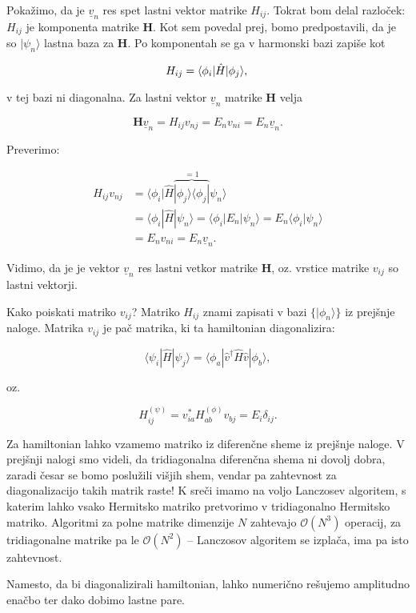 \documentclass[a4 paper, 12pt]{article}
\begin{document}
Pokažimo, da je $\underline{v}_n$ res spet lastni vektor matrike $H_{ij}$. Tokrat bom delal razloček: $H_{ij}$
je komponenta matrike $\mathbf{H}$. Kot sem povedal prej, bomo predpostavili, da je so $|\psi_n\rangle$ lastna baza
za $\mathbf{H}$. Po komponentah se ga v harmonski bazi zapiše kot

\[
	H_{ij} = \langle\phi_i|\hat{H}|\phi_j\rangle, \\
\]

v tej bazi ni diagonalna. Za lastni vektor $\underline{v}_n$ matrike $\mathbf{H}$ velja

\[
	\mathbf{H}\underline{v}_n = H_{ij}v_{nj} = E_n v_{ni} = E_n \underline{v}_n.
\]

Preverimo:

\begin{align*}
	H_{ij}v_{nj} &= \langle\phi_i|\hat{H}\overbrace{|\phi_j\rangle\langle\phi_j|}^{= 1}\psi_n\rangle \\
	&= \langle\phi_i|\hat{H}|\psi_n\rangle = \langle\phi_i|E_n|\psi_n\rangle = E_n \langle\phi_i|\psi_n\rangle \\
	&= E_n v_{ni} = E_n \underline{v}_n.
\end{align*}

Vidimo, da je je vektor $\underline{v}_n$ res lastni vetkor matrike $\mathbf{H}$, oz. vrstice matrike $v_{ij}$ so
lastni vektorji.

Kako poiskati matriko $v_{ij}$? Matriko $H_{ij}$ znami zapisati v bazi $\big\{|\phi_n\rangle\big\}$ iz prejšnje naloge.
Matrika $v_{ij}$ je pač matrika, ki ta hamiltonian diagonalizira:

\[
	\langle\psi_i|\hat{H}|\psi_j\rangle = \langle\phi_a|\hat{v}^\dagger\hat{H}\hat{v}|\phi_b\rangle,
\]

oz.

\[
	H^{(\psi)}_{ij} = v_{ia}^* H^{(\phi)}_{ab} v_{bj} = E_i\delta_{ij}.
\]

Za hamiltonian lahko vzamemo matriko iz diferenčne sheme iz prejšnje naloge. V prejšnji nalogi smo videli, da
tridiagonalna diferenčna shema ni dovolj dobra, zaradi česar se bomo poslužili višjih shem, vendar pa zahtevnost
za diagonalizacijo takih matrik raste! K sreči imamo na voljo Lanczosev algoritem, s katerim lahko vsako Hermitsko matriko
pretvorimo v tridiagonalno Hermitsko matriko. Algoritmi za polne matrike dimenzije $N$ zahtevajo $\mathcal{O}(N^3)$
operacij, za tridiagonalne matrike pa le $\mathcal{O}(N^2)$ -- Lanczosov algoritem se izplača, ima pa isto zahtevnost.

Namesto, da bi diagonalizirali hamiltonian, lahko numerično rešujemo amplitudno enačbo ter dako dobimo lastne pare.
\end{document}
